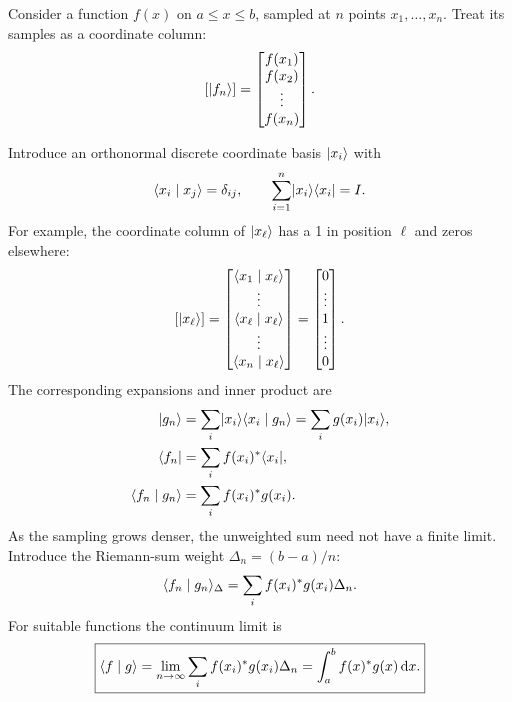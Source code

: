 Consider a function $f(x)$ on $a\le x\le b$, sampled at $n$ points
$x_1,\ldots,x_n$. Treat its samples as a coordinate column:
\[
 [\lvert f_n\rangle]=\begin{bmatrix}f(x_1)\\f(x_2)\\\vdots\\f(x_n)\end{bmatrix}.
\]
\begin{center}
\end{center}
Introduce an orthonormal discrete coordinate basis $\lvert x_i\rangle$ with
\[
 \langle x_i\mid x_j\rangle=\delta_{ij},\qquad
 \sum_{i=1}^{n}\lvert x_i\rangle\langle x_i\rvert=I.
\]
For example, the coordinate column of $\lvert x_\ell\rangle$ has a 1 in
position $\ell$ and zeros elsewhere:
\[
 [\lvert x_\ell\rangle]=
 \begin{bmatrix}\langle x_1\mid x_\ell\rangle\\\vdots\\\langle x_\ell\mid x_\ell\rangle\\\vdots\\\langle x_n\mid x_\ell\rangle\end{bmatrix}
 =\begin{bmatrix}0\\\vdots\\1\\\vdots\\0\end{bmatrix}.
\]
The corresponding expansions and inner product are
\begin{align*}
 \lvert g_n\rangle&=\sum_i\lvert x_i\rangle\langle x_i\mid g_n\rangle
           =\sum_i g(x_i)\lvert x_i\rangle,\\
 \langle f_n\rvert&=\sum_i f(x_i)^*\langle x_i\rvert,\\
 \langle f_n\mid g_n\rangle&=\sum_i f(x_i)^*g(x_i).
\end{align*}
As the sampling grows denser, the unweighted sum need not have a
finite limit. Introduce the Riemann-sum weight $\Delta_n=(b-a)/n$:
\[
 \langle f_n\mid g_n\rangle_{\Delta}=\sum_i f(x_i)^*g(x_i)\Delta_n.
\]
For suitable functions the continuum limit is
\[
 \boxed{\langle f\mid g\rangle=\lim_{n\to\infty}
 \sum_i f(x_i)^*g(x_i)\Delta_n=\int_a^b f(x)^*g(x)\mathop{}\!\mathrm{d} x.}
\]
